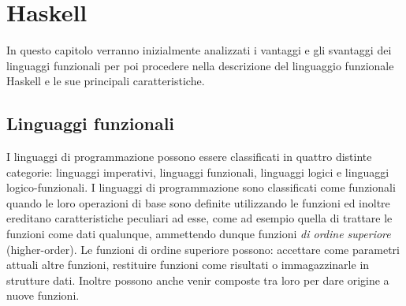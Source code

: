 \chapter{Haskell}\label{ch:haskell}

\lstset{language=haskell, frame=lines, aboveskip=\bigskipamount, belowskip=\bigskipamount}


\newcommand{\lazy}{\emph{lazy}\,}
{\lstset{language=haskell, tabsize=3, showspaces=false, frame=lines, aboveskip=\bigskipamount, belowskip=\bigskipamount}} {} 

In questo capitolo verranno inizialmente analizzati i vantaggi e gli svantaggi dei linguaggi funzionali per poi procedere nella descrizione del linguaggio funzionale Haskell e le sue principali caratteristiche. 

\section{Linguaggi funzionali}
I linguaggi di programmazione possono essere classificati in quattro distinte categorie: 
linguaggi imperativi, linguaggi funzionali, linguaggi logici e linguaggi logico-funzionali.
I linguaggi di programmazione sono classificati come funzionali quando le loro 
operazioni di base sono definite utilizzando le funzioni ed 
inoltre ereditano caratteristiche peculiari ad esse, come ad esempio quella di trattare 
le funzioni come dati qualunque, ammettendo dunque funzioni \emph{di ordine superiore} (higher-order). Le funzioni di ordine superiore possono: accettare come parametri attuali 
altre funzioni, restituire funzioni come risultati o immagazzinarle in strutture dati. Inoltre possono  anche venir composte tra 
loro per dare origine a nuove funzioni.

